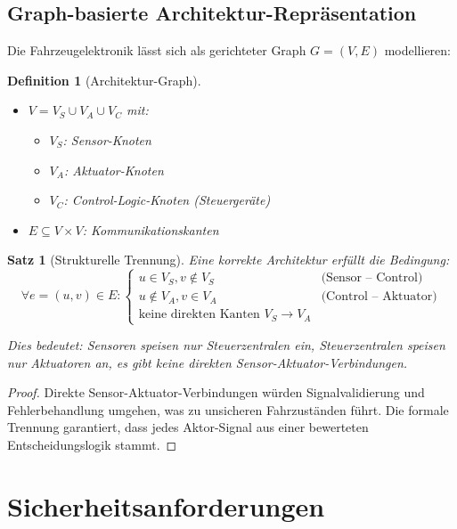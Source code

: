 ﻿\documentclass[a4paper,12pt]{article}
\newtheorem{definition}{Definition}
\newtheorem{satz}{Satz}
\begin{document}
\subsection{Graph-basierte Architektur-Repräsentation}

Die Fahrzeugelektronik lässt sich als gerichteter Graph $G = (V, E)$ modellieren:

\begin{definition}[Architektur-Graph]
\begin{itemize}
	\item $V = V_S \cup V_A \cup V_C$ mit:
	\begin{itemize}
		\item $V_S$: Sensor-Knoten
		\item $V_A$: Aktuator-Knoten
		\item $V_C$: Control-Logic-Knoten (Steuergeräte)
	\end{itemize}
	\item $E \subseteq V \times V$: Kommunikationskanten
\end{itemize}
\end{definition}

\begin{satz}[Strukturelle Trennung]
Eine korrekte Architektur erfüllt die Bedingung:
\[
\forall e = (u, v) \in E: 
\begin{cases}
u \in V_S, v \notin V_S & \text{(Sensor -- Control)} \\
u \notin V_A, v \in V_A & \text{(Control -- Aktuator)} \\
\text{keine direkten Kanten } V_S \to V_A &
\end{cases}
\]

Dies bedeutet: Sensoren speisen nur Steuerzentralen ein, Steuerzentralen speisen nur 
Aktuatoren an, es gibt keine direkten Sensor-Aktuator-Verbindungen.
\end{satz}

\begin{proof}
Direkte Sensor-Aktuator-Verbindungen würden Signalvalidierung und Fehlerbehandlung 
umgehen, was zu unsicheren Fahrzuständen führt. Die formale Trennung garantiert, 
dass jedes Aktor-Signal aus einer bewerteten Entscheidungslogik stammt. 
\end{proof}

\section{Sicherheitsanforderungen}
\end{document}
